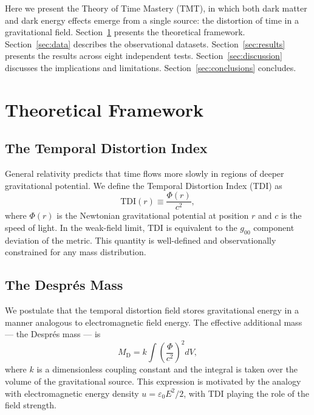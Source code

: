 \documentclass[manuscript,linenumbers]{aastex631}
\newcommand{\tdi}{\mathrm{TDI}}
\newcommand{\MD}{M_{\mathrm{D}}}
\begin{document}
Here we present the Theory of Time Mastery (TMT), in which both dark
matter and dark energy effects emerge from a single source: the
distortion of time in a gravitational field.
Section~\ref{sec:theory} presents the theoretical framework.
Section~\ref{sec:data} describes the observational datasets.
Section~\ref{sec:results} presents the results across eight independent
tests.
Section~\ref{sec:discussion} discusses the implications and limitations.
Section~\ref{sec:conclusions} concludes.

\section{Theoretical Framework}
\label{sec:theory}

\subsection{The Temporal Distortion Index}
\label{sec:tdi}

General relativity predicts that time flows more slowly in regions of
deeper gravitational potential.  We define the Temporal Distortion
Index (TDI) as
\begin{equation}
  \tdi(r) \equiv \frac{\Phi(r)}{c^{2}},
  \label{eq:tdi}
\end{equation}
where $\Phi(r)$ is the Newtonian gravitational potential at position
$r$ and $c$ is the speed of light.  In the weak-field limit, $\tdi$
is equivalent to the $g_{00}$ component deviation of the metric.
This quantity is well-defined and observationally constrained for any
mass distribution.

\subsection{The Despr\'{e}s Mass}
\label{sec:despres}

We postulate that the temporal distortion field stores gravitational
energy in a manner analogous to electromagnetic field energy.  The
effective additional mass --- the Despr\'{e}s mass --- is
\begin{equation}
  \MD = k \int \left(\frac{\Phi}{c^{2}}\right)^{2} dV,
  \label{eq:MD}
\end{equation}
where $k$ is a dimensionless coupling constant and the integral is
taken over the volume of the gravitational source.  This expression is
motivated by the analogy with electromagnetic energy density
$u = \varepsilon_{0}E^{2}/2$, with TDI playing the role of the field
strength.
\end{document}

